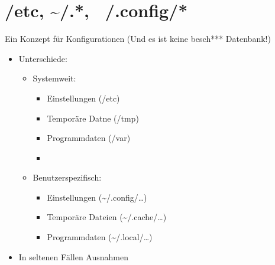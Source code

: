 \section[/etc, \textasciitilde/.*]{/etc, \textasciitilde/.*, ~/.config/*}
\begin{frame}{Ein Konzept für Konfigurationen \tiny (Und es ist keine besch*** Datenbank!)}
\begin{itemize}
\item Unterschiede:
	\begin{itemize}
	\item Systemweit:
		\begin{itemize}
		\item Einstellungen (/etc)
		\item Temporäre Datne (/tmp)
		\item Programmdaten (/var)
		\item 
		\end{itemize}
	\item Benutzerspezifisch:
	\begin{itemize}
		\item Einstellungen (\textasciitilde/.config/…)
		\item Temporäre Dateien (\textasciitilde/.cache/…)
		\item Programmdaten (\textasciitilde/.local/…)	
	\end{itemize}
	\end{itemize}
\item In seltenen Fällen Ausnahmen
\end{itemize}
\end{frame}